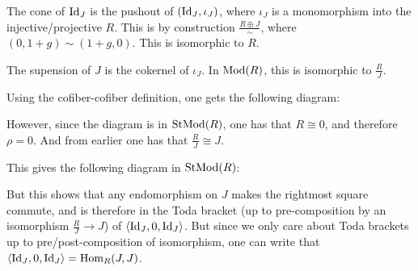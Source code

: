 The cone of \( \operatorname{Id}_J \) is the pushout of \( (\operatorname{Id}_J, \iota_J) \), where \( \iota_J \) is a monomorphism into the injective/projective \( R \). This is by construction \( \frac{R \oplus J}{\sim} \), where \( (0, 1+g) \sim (1+g, 0) \). This is isomorphic to \( R \).

The supension of \( J \) is the cokernel of \( \iota_J \). In \( \operatorname{Mod}(R) \), this is isomorphic to \( \frac{R}{J} \).

Using the cofiber-cofiber definition, one gets the following diagram:

\begin{center}
\end{center}

However, since the diagram is in \( \operatorname{StMod}(R) \), one has that \( R \cong 0 \), and therefore \( \rho = 0 \). And from earlier one has that \( \frac{R}{J} \cong J \).

This gives the following diagram in \( \operatorname{StMod}(R) \):

\begin{center}
\end{center}

But this shows that any endomorphism on \( J \) makes the rightmost square commute, and is therefore in the Toda bracket (up to pre-composition by an isomorphism \( \frac{R}{J} \to J \)) of \( \langle \operatorname{Id}_J, 0, \operatorname{Id}_J \rangle \). But since we only care about Toda brackets up to pre/post-composition of isomorphism, one can write that \( \langle \operatorname{Id}_J, 0, \operatorname{Id}_J \rangle = \operatorname{Hom}_R(J, J) \).


